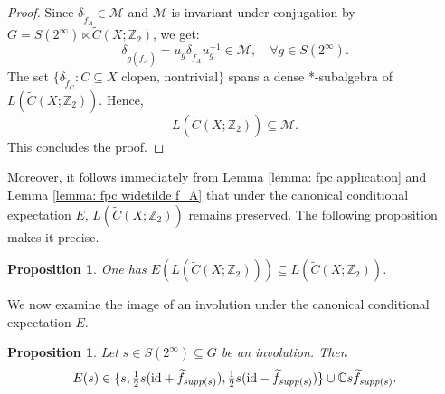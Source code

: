 \documentclass[11pt]{amsart}
\newcommand{\id}{{\rm id}}
\newcommand{\suppg}{{\it supp}}
\theoremstyle{plain}
\newtheorem{proposition}[theorem]{Proposition}
\theoremstyle{definition}
\theoremstyle{remark}
\numberwithin{equation}{section}
\begin{document}
\begin{proof}
Since $\delta_{\widetilde f_A} \in \mathcal{M}$ and $\mathcal{M}$ is invariant under conjugation by $G = S(2^\infty) \ltimes \widetilde C(X;\mathbb{Z}_2)$, we get:
\begin{equation}\label{eq:closure_under_conjugation}
\delta_{g(\widetilde f_A)} = u_g \delta_{\widetilde f_A} u_g^{-1} \in \mathcal{M}, \quad \forall g \in S(2^\infty).
\end{equation}
The set $\{\delta_{\widetilde f_C} : C \subseteq X \text{ clopen, nontrivial}\}$ spans a dense *-subalgebra of $L(\widetilde C(X;\mathbb Z_2))$. Hence,
\begin{equation}\label{eq:algebra_generated}
L(\widetilde C(X;\mathbb Z_2)) \subseteq \mathcal{M}.
\end{equation}
This concludes the proof.
\end{proof}
Moreover, it follows immediately from Lemma \ref{lemma: fpc application} and Lemma \ref{lemma: fpc widetilde f_A} that under the canonical conditional expectation $E$, $L(\widetilde C(X;\mathbb Z_2))$ remains preserved. The following proposition makes it precise.
\begin{proposition}\label{cor: E(widetilde C(X))}
	One has $E(L(\widetilde C(X;\mathbb Z_2)))\subseteq L(\widetilde C(X;\mathbb Z_2))$.
\end{proposition}
We now examine the image of an involution under the canonical conditional expectation $E$.
\begin{proposition}
	Let $s\in S(2^\infty)\subseteq G$ be an involution. Then $$E(s)\in\{s,\tfrac{1}{2}s(\id+\widetilde f_{\suppg(s)}),\tfrac{1}{2}s(\id-\widetilde f_{\suppg(s)})\}\cup \mathbb C s\widetilde f_{\suppg(s)}.$$
\end{proposition}
\end{document}
